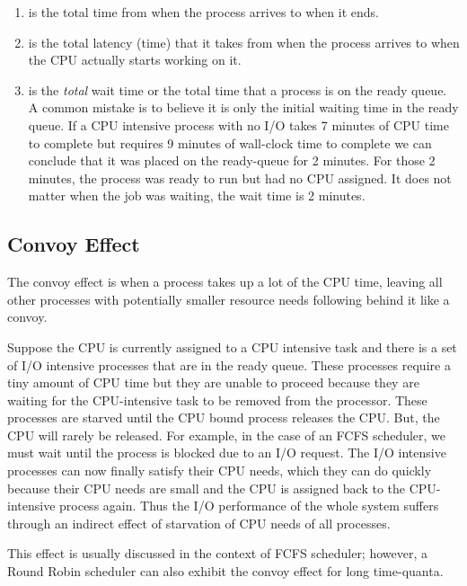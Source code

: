 \begin{enumerate}
\item {} is the total time from when the process arrives to when it ends.
  \item {} is the total latency (time) that it takes from when the process arrives to when the CPU actually starts working on it.
  \item {} is the \emph{total} wait time or the total time that a process is on the ready queue.
    A common mistake is to believe it is only the initial waiting time in the ready queue.
    If a CPU intensive process with no I/O takes 7 minutes of CPU time to complete but requires 9 minutes of wall-clock time to complete we can conclude that it was placed on the ready-queue for 2 minutes.
    For those 2 minutes, the process was ready to run but had no CPU assigned.
    It does not matter when the job was waiting, the wait time is 2 minutes.

\end{enumerate}

\subsection{Convoy Effect}

The convoy effect is when a process takes up a lot of the CPU time, leaving all other processes with potentially smaller resource needs following behind it like a convoy.

Suppose the CPU is currently assigned to a CPU intensive task and there is a set of I/O intensive processes that are in the ready queue.
These processes require a tiny amount of CPU time but they are unable to proceed because they are waiting for the CPU-intensive task to be removed from the processor.
These processes are starved until the CPU bound process releases the CPU.
But, the CPU will rarely be released.
For example, in the case of an FCFS scheduler, we must wait until the process is blocked due to an I/O request.
The I/O intensive processes can now finally satisfy their CPU needs, which they can do quickly because their CPU needs are small and the CPU is assigned back to the CPU-intensive process again.
Thus the I/O performance of the whole system suffers through an indirect effect of starvation of CPU needs of all processes.

This effect is usually discussed in the context of FCFS scheduler; however, a Round Robin scheduler can also exhibit the convoy effect for long time-quanta.

